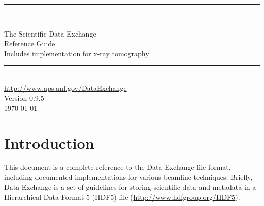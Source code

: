\documentclass[usletter,11pt]{article}
\newcommand{\HRule}{{\color{brightOrange} \rule{\linewidth}{0.5mm}}}
\begin{document}
\pagestyle{empty}

\begin{center}
\vspace*{2.5cm}

\HRule \\[0.6cm]
\begin{spacing}{2.0}

{\color{softBlue} \Huge \sffamily The Scientific Data Exchange}\\[0.15cm]
{\color{softBlue} \Huge \sffamily Reference Guide}\\[0.15cm]
{\color{softBlue} \sffamily Includes implementation for x-ray tomography}\\[0.15cm]

\end{spacing}
\HRule \\[1.0cm]
{\Large \color{softBlue} \sffamily \url{http://www.aps.anl.gov/DataExchange}}\\[1.0cm]
{\Large \color{softBlue} \sffamily Version 0.9.5}\\[1.0cm]
{\Large \color{softBlue} \sffamily \today}

\end{center}
\newpage


\newpage

\pagestyle{fancy}

\tableofcontents


\newpage

\setcounter{page}{1}

\section{Introduction}

This document is a complete reference to the Data Exchange file format, 
including documented implementations for various beamline techniques. Briefly,
Data Exchange is a set of guidelines for storing scientific data and metadata
in a Hierarchical Data Format 5 (HDF5) file (\url{http://www.hdfgroup.org/HDF5}). 
\end{document}

